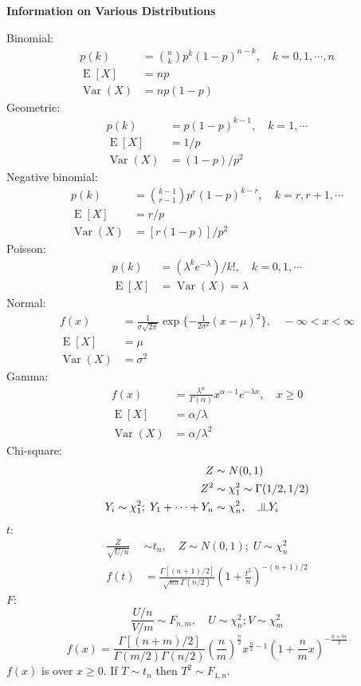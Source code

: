 \documentclass[a4paper]{article}
\newcommand{\subheading}[1]{{\scriptsize\textbf{#1}}}
\renewenvironment{section}[1]
  {
    \subheading{#1}

  }{
    \smallskip
  }
\newcommand{\independent}{\raisebox{0.05em}{\rotatebox[origin=c]{90}{$\models$}}}
\newcommand{\expectation}[1]{\operatorname{E}[#1]}
\DeclareMathOperator{\Var}{Var}
\begin{document}
\begin{multicols*}{4}

\begin{section}{Information on Various Distributions}
  Binomial:
  \begin{align*}
    p(k) &= \binom{n}{k} p^k (1-p)^{n-k}, \quad k=0,1,\cdots,n \\
    \expectation{X} &= np \\
    \Var(X) &= np(1-p)
  \end{align*}
  Geometric:
  \begin{align*}
    p(k) &= p(1-p)^{k-1}, \quad k=1,\cdots \\
    \expectation{X} &= 1/p \\
    \Var(X) &= (1-p)/p^2
  \end{align*}
  Negative binomial:
  \begin{align*}
    p(k) &= \binom{k-1}{r-1} p^r (1-p)^{k-r}, \quad k=r,r+1,\cdots \\
    \expectation{X} &= r/p \\
    \Var(X) &= [r(1-p)]/p^2
  \end{align*}
  Poisson:
  \begin{align*}
    p(k) &= (\lambda^k e^{-\lambda})/k!, \quad k=0,1,\cdots \\
    \expectation{X} &= \Var(X) = \lambda
  \end{align*}
  Normal:
  \begin{align*}
    f(x) &= \frac{1}{\sigma\sqrt{2\pi}}\exp\{-\frac{1}{2\sigma^2}(x-\mu)^2\},
      \quad -\infty < x < \infty \\
    \expectation{X} &= \mu \\
    \Var(X) &= \sigma^2
  \end{align*}
  Gamma:
  \begin{align*}
    f(x) &= \frac{\lambda^\alpha}{\Gamma(\alpha)} x^{\alpha-1} e^{-\lambda x},
      \quad x \geq 0 \\
    \expectation{X} &= \alpha / \lambda \\
    \Var(X) &= \alpha / \lambda^2
  \end{align*}
  Chi-square:
  \begin{align*}
    Z &\sim N(0, 1) \\
    Z^2 &\sim \chi^2_1 \sim \Gamma(1/2, 1/2) \\
    Y_i \sim \chi^2_1;\; Y_1 + \cdots + Y_n &\sim \chi^2_n, \quad \independent Y_i
  \end{align*}
  $t$:
  \begin{align*}
    \frac{Z}{\sqrt{U/n}} &\sim t_n, \quad Z \sim N(0, 1);\; U \sim \chi^2_n \\
    f(t) &= \frac{\Gamma[(n+1)/2]}{\sqrt{n\pi}\Gamma(n/2)}
      \left ( 1 + \frac{t^2}{n} \right )^{-(n+1)/2}
  \end{align*}
  $F$:
  $$\frac{U/n}{V/m} \sim F_{n, m}, \quad U \sim \chi^2_n; V \sim \chi^2_m$$
  {\tiny
  $$f(x) = \frac{\Gamma[(n+m)/2]}{\Gamma(m/2)\Gamma(n/2)}
    \left ( \frac{n}{m} \right )^{\frac{n}{2}}
    x^{\frac{n}{2}-1}
    \left (1 + \frac{n}{m}x \right )^{-\frac{n+m}{2}}$$
  }
  $f(x)$ is over $x \geq 0$. If $T \sim t_n$ then $T^2 \sim F_{1, n}$.


\end{section}
\end{multicols*}
\end{document}
